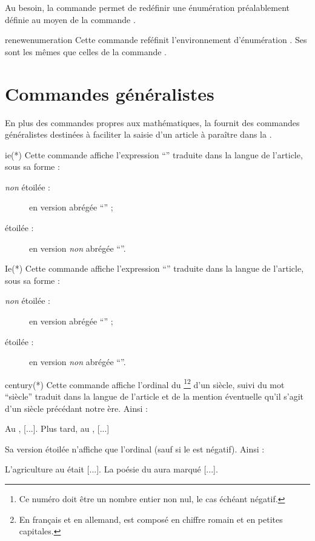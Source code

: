 \documentclass[french,nolocaltoc]{nwejmart}
\newtheorem[style=definition]{fait}
\newtheorem[title=expérience]{experience}
\newtheorem[title-plural=anneaux]{anneau}
\newtheorem[title=idéal,title-plural=idéaux]{ideal}
\begin{document}
Au besoin, la commande  permet de redéfinir une
énumération préalablement définie au moyen de la commande
.

\begin{docCommand}[doc new=2019-03-18]{renewenumeration}{}
  Cette commande reféfinit l'environnement d'énumération . Ses
   sont les mêmes que celles de la commande
  .
\end{docCommand}

\section{Commandes généralistes}
\label{sec:comm-gener}

En plus des commandes propres aux mathématiques, la \nwejmauthorcl{} fournit des
commandes généralistes destinées à faciliter la saisie d'un article à paraître
dans la \nwejm{}.

\begin{docCommand}{ie(*)}{}
  Cette commande affiche l'expression \enquote{\ie*{}} traduite dans la langue
  de l'article, sous sa forme :
  \begin{description}
  \item[\emph{non} étoilée :] en version abrégée \enquote{\ie{}} ;
  \item[étoilée :] en version \emph{non} abrégée \enquote{\ie*{}}.
  \end{description}
\end{docCommand}

\begin{docCommand}{Ie(*)}{}
  Cette commande affiche l'expression \enquote{\Ie*{}} traduite dans la langue
  de l'article, sous sa forme :
  \begin{description}
  \item[\emph{non} étoilée :] en version abrégée \enquote{\Ie{}} ;
  \item[étoilée :] en version \emph{non} abrégée \enquote{\Ie*{}}.
  \end{description}
\end{docCommand}

\begin{docCommand}{century(*)}{}
  Cette commande affiche l'ordinal du \footnote{Ce numéro doit être
    un nombre entier non nul, le cas échéant négatif.}\footnote{En français et en
    allemand,  est composé en chiffre romain et en petites
    capitales.} d'un siècle, suivi du mot \enquote{siècle} traduit dans la
  langue de l'article et de la mention éventuelle qu'il s'agit d'un siècle
  précédant notre ère. Ainsi :
\begin{bodycode}
Au , [...]. Plus tard, au , [...]
\end{bodycode}
  Sa version étoilée n'affiche que l'ordinal (sauf si le  est
  négatif). Ainsi :
\begin{bodycode}
L'agriculture au  était [...].
La poésie du  aura marqué [...].
\end{bodycode}
\end{docCommand}
\end{document}
